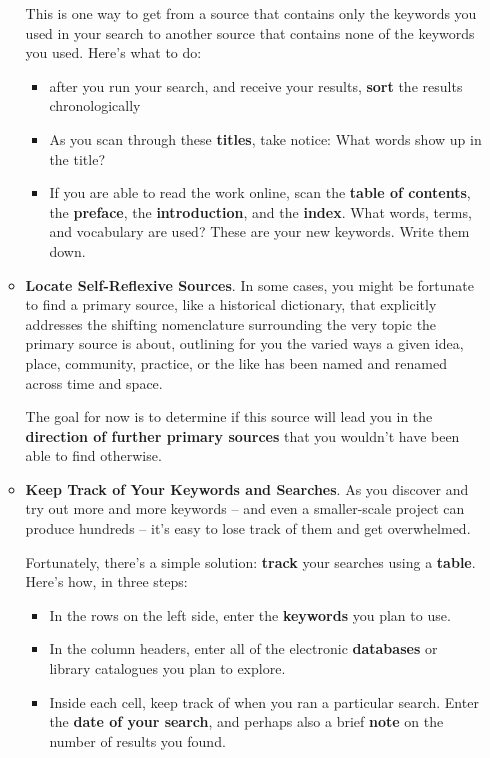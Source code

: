\documentclass[11pt]{article}
\begin{document}
\begin{itemize}
\begin{exercise}
\begin{itemize}
This is one way to get from a source that contains only the keywords you used in your search to another source that contains none of the keywords you used. Here’s what to do: 
\begin{itemize}
\item after you run your search, and receive your results, \textbf{sort} the results chronologically
\item As you scan through these \textbf{titles}, take notice: What words show up in the title? 
\item If you are able to read the work online, scan the \textbf{table of contents}, the \textbf{preface}, the \textbf{introduction}, and the \textbf{index}.  What words, terms, and vocabulary are used? These are your new keywords. Write them down.
\end{itemize}

\item \textbf{Locate Self-Reflexive Sources}. In some cases, you might be fortunate to find a primary source, like a historical dictionary, that explicitly addresses the shifting nomenclature surrounding the very topic the primary source is about, outlining for you the varied ways a given idea, place, community, practice, or the like has been named and renamed across time and space. 

The goal for now is to determine if this source will lead you in the \textbf{direction of further primary sources} that you wouldn’t have been able to find otherwise.

\item \textbf{Keep Track of Your Keywords and Searches}.  As you discover and try out more and more keywords -- and even a smaller-scale project can produce hundreds -- it’s easy to lose track of them and get overwhelmed. 

Fortunately, there’s a simple solution: \textbf{track} your searches using a \textbf{table}. Here’s how, in three steps:
\begin{itemize}
\item In the rows on the left side, enter the \textbf{keywords} you plan to use.
\item In the column headers, enter all of the electronic \textbf{databases} or library catalogues you plan to explore.
\item Inside each cell, keep track of when you ran a particular search. Enter the \textbf{date of your search}, and perhaps also a brief \textbf{note} on the number of results you found.
\end{itemize}
\end{itemize}
\end{exercise}


\end{itemize}
\end{document}
